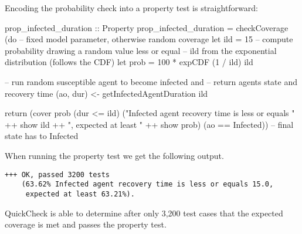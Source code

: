 Encoding the probability check into a property test is straightforward:

\begin{HaskellCode}
prop_infected_duration :: Property
prop_infected_duration = checkCoverage (do
  -- fixed model parameter, otherwise random coverage
  let ild  = 15
  -- compute probability drawing a random value less or equal
  -- ild from the exponential distribution (follows the CDF)
  let prob = 100 * expCDF (1 / ild) ild

  -- run random susceptible agent to become infected and
  -- return agents state and recovery time
  (ao, dur) <- getInfectedAgentDuration ild

  return (cover prob (dur <= ild) 
            ("Infected agent recovery time is less or equals " ++ show ild ++ 
             ", expected at least " ++ show prob) 
            (ao == Infected)) -- final state has to Infected
\end{HaskellCode}

When running the property test we get the following output.

\begin{footnotesize}
\begin{verbatim}
+++ OK, passed 3200 tests 
    (63.62% Infected agent recovery time is less or equals 15.0, 
     expected at least 63.21%).
\end{verbatim}
\end{footnotesize}

QuickCheck is able to determine after only 3,200 test cases that the expected coverage is met and passes the property test.